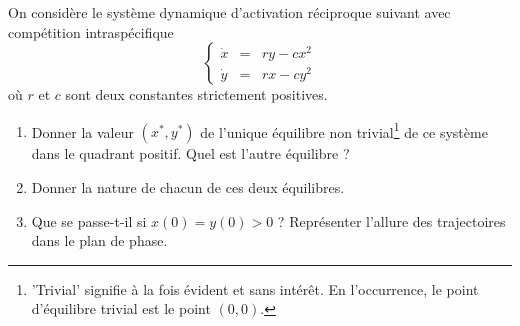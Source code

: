 \solution{\todo{}}

\begin{exercise} \label{SystDyn-Quadratique}
  On considère le système dynamique d’activation réciproque suivant avec compétition intraspécifique
  $$
  \left\{\begin{array}{rcl}
         \dot x & = & r y - cx^2 \\ 
         \dot y & = & r x - cy^2 
         \end{array}\right.
  $$
  où $r$ et $c$ sont deux constantes strictement positives.
  \begin{enumerate}
   \item Donner la valeur $(x^*, y^*)$ de l’unique équilibre non trivial\footnote{'Trivial' signifie à la fois évident et sans intérêt. En l'occurrence, le point d'équilibre trivial est le point $(0, 0)$.} de ce système dans le quadrant positif. Quel est l’autre équilibre ?
   \item Donner la nature de chacun de ces deux équilibres.
   \item Que se passe-t-il si $x(0) = y(0) > 0$ ? Représenter l’allure des trajectoires dans le plan de phase. 
  \end{enumerate}
\end{exercise}

\solution{\todo{}}

